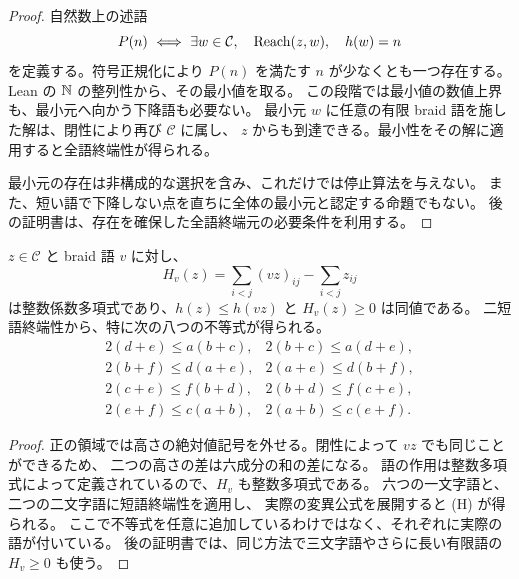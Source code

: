 \begin{proof}
\leanok
自然数上の述語
\[
 P(n)\ \Longleftrightarrow\
 \exists w\in\mathcal C,\quad\Reach(z,w),\quad h(w)=n
\]
を定義する。符号正規化により $P(n)$ を満たす $n$ が少なくとも一つ存在する。
Lean の $\mathbb N$ の整列性から、その最小値を取る。
この段階では最小値の数値上界も、最小元へ向かう下降語も必要ない。
最小元 $w$ に任意の有限 braid 語を施した解は、閉性により再び $\mathcal C$ に属し、
$z$ からも到達できる。最小性をその解に適用すると全語終端性が得られる。

最小元の存在は非構成的な選択を含み、これだけでは停止算法を与えない。
また、短い語で下降しない点を直ちに全体の最小元と認定する命題でもない。
後の証明書は、存在を確保した全語終端元の必要条件を利用する。
\end{proof}

\begin{lemma}[語の高さ差を多項式として扱う]
\label{bp:pos-guards}
\leanok
$z\in\mathcal C$ と braid 語 $v$ に対し、
\[
 H_v(z)=\sum_{i<j}(vz)_{ij}-\sum_{i<j}z_{ij}
\]
は整数係数多項式であり、$h(z)\leq h(vz)$ と $H_v(z)\geq0$ は同値である。
二短語終端性から、特に次の八つの不等式が得られる。
\[
\begin{array}{ll}
2(d+e)\leq a(b+c),&2(b+c)\leq a(d+e),\\
2(b+f)\leq d(a+e),&2(a+e)\leq d(b+f),\\
2(c+e)\leq f(b+d),&2(b+d)\leq f(c+e),\\
2(e+f)\leq c(a+b),&2(a+b)\leq c(e+f).
\end{array}
\tag{H}
\]
\end{lemma}

\begin{proof}
\leanok
正の領域では高さの絶対値記号を外せる。閉性によって $vz$ でも同じことができるため、
二つの高さの差は六成分の和の差になる。
語の作用は整数多項式によって定義されているので、$H_v$ も整数多項式である。
六つの一文字語と、二つの二文字語に短語終端性を適用し、
実際の変異公式を展開すると (H) が得られる。
ここで不等式を任意に追加しているわけではなく、それぞれに実際の語が付いている。
後の証明書では、同じ方法で三文字語やさらに長い有限語の $H_v\geq0$ も使う。
\end{proof}

